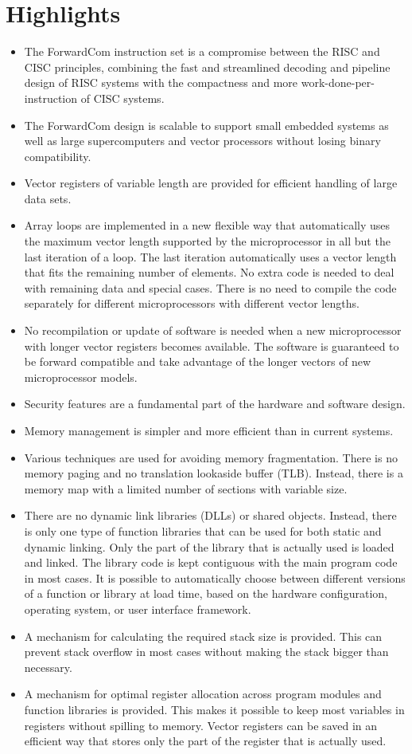 \documentclass[forwardcom.tex]{subfiles}
\begin{document}
\section{Highlights}
\begin{itemize}
\item The ForwardCom instruction set is a compromise between the RISC and CISC principles, combining the fast and streamlined decoding and pipeline design of RISC systems with the compactness and more work-done-per-instruction of CISC systems.
\item The ForwardCom design is scalable to support small embedded systems as well as large supercomputers and vector processors without losing binary compatibility.
\item Vector registers of variable length are provided for efficient handling of large data sets.
\item Array loops are implemented  in a new flexible way that automatically uses the maximum vector length supported by the microprocessor in all but the last iteration of a loop. The last iteration automatically uses a vector length that fits the remaining number of elements. No extra code is needed to deal with remaining data and special cases. There is no need to compile the code separately for different microprocessors with different vector lengths.
\item No recompilation or update of software is needed when a new microprocessor with longer vector registers becomes available. The software is guaranteed to be forward compatible and take advantage of the longer vectors
of new microprocessor models.
\item Security features are a fundamental part of the hardware and software design.
\item Memory management is simpler and more efficient than in current systems. 
\item Various techniques are used for avoiding memory 
fragmentation. There is no memory paging and no translation lookaside buffer (TLB). Instead, there is a memory map with a limited number of sections with variable size.
\item There are no dynamic link libraries (DLLs) or shared objects. Instead, there is only one type of function libraries 
that can be used for both static and dynamic linking. Only the part of the library that is actually used is loaded and linked. The library code is kept contiguous with the main program code in most cases. It is possible to automatically choose between different versions of a function or library at load time, based on the hardware configuration, operating system, or user interface framework.
\item A mechanism for calculating the required stack size is provided. This can prevent stack overflow in most cases without making the stack bigger than necessary.
\item A mechanism for optimal register allocation across program modules and function libraries is provided. This makes it possible to keep most variables in registers without spilling to memory. Vector registers can be saved in an efficient way that stores only the part of the register that is actually used.
\end{itemize}
\end{document}
